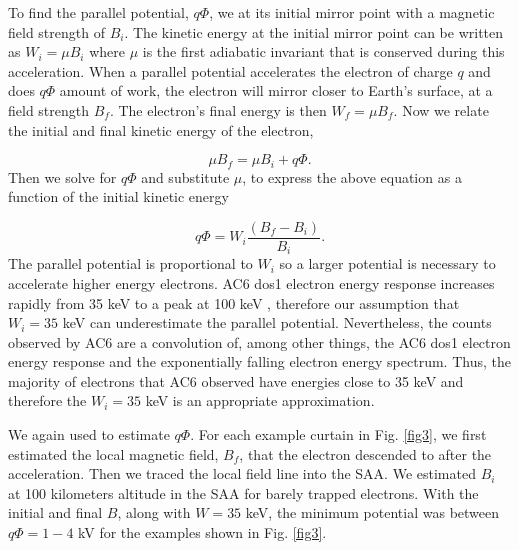 \documentclass[draft]{agujournal2019}
\begin{document}
To find the parallel potential, $q \Phi$,  we  at its initial mirror point with a magnetic field strength of $B_i$. The kinetic energy at the initial mirror point can be written as $W_i = \mu B_i$ where $\mu$ is the first adiabatic invariant that is conserved during this acceleration. When a parallel potential accelerates the electron of charge $q$ and does $q \Phi$ amount of work, the electron will mirror closer to Earth's surface, at a field strength $B_f$. The electron's final energy is then $W_f = \mu B_f$. Now we relate the initial and final kinetic energy of the electron,

\begin{equation}
\mu B_f = \mu B_i + q \Phi.
\end{equation} Then we solve for $q \Phi$ and substitute $\mu$, to express the above equation as a function of the initial kinetic energy 

\begin{equation}
 q \Phi = W_i \frac{(B_f - B_i)}{B_i}.
\end{equation} The parallel potential is proportional to $W_i$ so a larger potential is necessary to accelerate higher energy electrons. AC6 dos1 electron energy response increases rapidly from 35 keV to a peak at 100 keV \cite<Figure 2 in>{O'Brien2019}, therefore our assumption that $W_i = 35$ keV can underestimate the parallel potential. Nevertheless, the counts observed by AC6 are a convolution of, among other things, the AC6 dos1 electron energy response and the exponentially falling electron energy spectrum. Thus, the majority of electrons that AC6 observed have energies close to 35 keV and therefore the $W_i = 35$ keV is an appropriate approximation.

We again used  to estimate $ q \Phi$. For each example curtain in Fig. \ref{fig3}, we first estimated the local magnetic field, $B_f$, that the electron descended to after the acceleration. Then we traced the local field line into the SAA. We estimated $B_i$ at 100 kilometers altitude in the SAA for barely trapped electrons. With the initial and final $B$, along with $W = 35$ keV, the minimum potential was between $q \Phi = 1-4$ kV for the examples shown in Fig. \ref{fig3}. 
\end{document}
